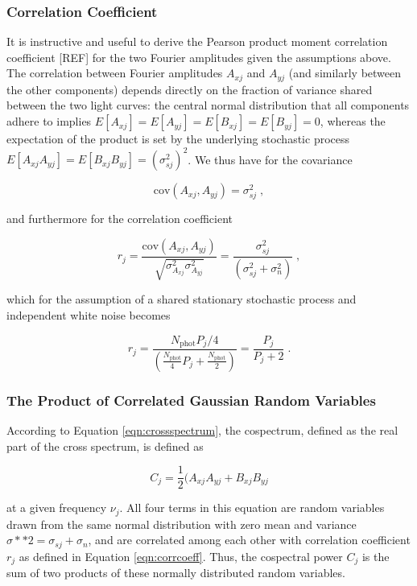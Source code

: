 \documentclass[fleqn,usenatbib]{mnras}
\begin{document}
\subsubsection{Correlation Coefficient}

It is instructive and useful to derive the Pearson product moment correlation coefficient [REF] for the two Fourier amplitudes given the assumptions above.
The correlation between Fourier amplitudes $A_{xj}$ and $A_{yj}$ (and similarly between the other components) depends directly on the fraction of variance shared between the two light curves: the central normal distribution that all components adhere to implies $E[A_{xj}] = E[A_{yj}] = E[B_{xj}] = E[B_{yj}] = 0$, whereas the expectation of the product is set by the underlying stochastic process $E[A_{xj}A_{yj}] = E[B_{xj}B_{yj}] = (\sigma_{sj}^2)^2$. 
We thus have for the covariance 

\[
\mathrm{cov}(A_{xj}, A_{yj}) = \sigma_{sj}^2 \; ,
\]

\noindent and furthermore for the correlation coefficient

\begin{equation}
r_j = \frac{\mathrm{cov}(A_{xj}, A_{yj})}{\sqrt{\sigma_{A_{xj}}^2\sigma_{A_{yj}}^2}} = \frac{\sigma_{sj}^2}{ (\sigma_{sj}^2 + \sigma_{n}^2)} \; ,
\end{equation}

\noindent which for the assumption of a shared stationary stochastic process and independent white noise becomes

\begin{equation}
r_j = \frac{N_{\mathrm{phot}}P_j/4}{\left(\frac{N_{\mathrm{phot}}}{4}P_j + \frac{N_{\mathrm{phot}}}{2}\right)} = \frac{P_j}{P_j + 2}\; .
\label{eqn:corrcoeff}
\end{equation}

\subsubsection{The Product of Correlated Gaussian Random Variables}

According to Equation \ref{eqn:crossspectrum}, the cospectrum, defined as the real part of the cross spectrum, is defined as 

\begin{equation}
\label{eqn:cospectrum}
C_j = \frac{1}{2}(A_{xj} A_{yj} + B_{xj} B_{yj} 
\end{equation}

\noindent at a given frequency $\nu_j$. All four terms in this equation are random variables drawn from the same normal distribution with zero mean and variance $\sigma**2 = \sigma_{sj} + \sigma_n$, and are correlated among each other with correlation coefficient $r_j$ as defined in Equation \ref{eqn:corrcoeff}. Thus, the cospectral power $C_j$ is the sum of two products of these normally distributed random variables.
\end{document}
